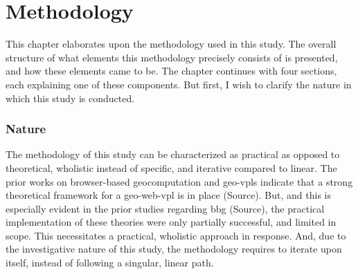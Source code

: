 \chapter{Methodology}
\label{chap:methodology}

This chapter elaborates upon the methodology used in this study. 
The overall structure of what elements this methodology precisely consists of is presented, and how these elements came to be. 
The chapter continues with four sections, each explaining one of these components.
But first, I wish to clarify the nature in which this study is conducted. 

\subsection*{Nature}
The methodology of this study can be characterized as practical as opposed to theoretical, wholistic instead of specific, and iterative compared to linear. The prior works on browser-based geocomputation and geo-vpls indicate that a strong theoretical framework for a \ac{geo-web-vpl} is in place (Source). 
But, and this is especially evident in the prior studies regarding \ac{bbg} (Source), the practical implementation of these theories were only partially successful, and limited in scope. 
This necessitates a practical, wholistic approach in response. 
And, due to the investigative nature of this study, the methodology requires to iterate upon itself, instead of following a singular, linear path. 



